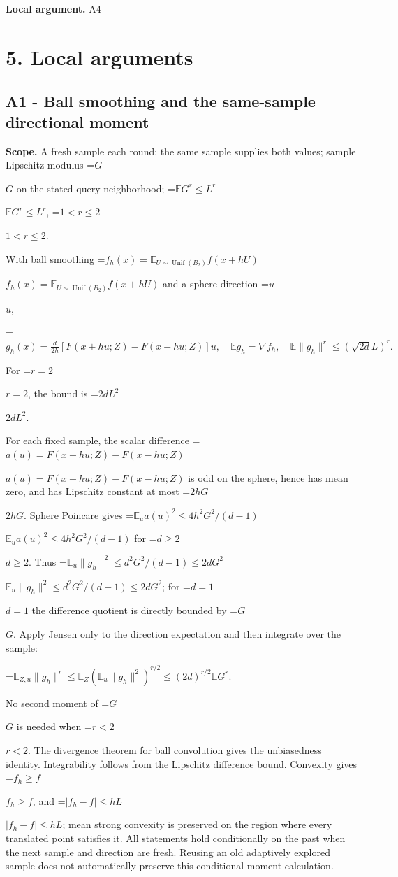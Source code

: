 \documentclass[10pt,a4paper]{article}
\newcommand{\AtlasMath}[1]{\par\begingroup\centering\setbox0=\hbox{$\displaystyle #1$}\ifdim\wd0>1.4\linewidth\typeout{ATLAS WIDE FORMULA: \the\wd0}\fi\ifdim\wd0>\linewidth\resizebox{\linewidth}{!}{\box0}\else\box0\fi\par\endgroup}
\newcommand{\AtlasInlineMath}[1]{\begingroup\setbox0=\hbox{$#1$}\ifdim\wd0>.4\linewidth\endgroup\AtlasMath{#1}\else\endgroup$#1$\fi}
\begin{document}
\textbf{Local argument.} A4

\section{5. Local arguments}
\subsection{A1 - Ball smoothing and the same-sample directional moment}
\textbf{Scope.} A fresh sample each round; the same sample supplies both values; sample Lipschitz modulus \AtlasInlineMath{G} on the stated query neighborhood; \AtlasInlineMath{\mathbb E G^r\le L^r}, \AtlasInlineMath{1<r\le2}.

With ball smoothing \AtlasInlineMath{f_h(x)=\mathbb E_{U\sim\operatorname{Unif}(B_2)}f(x+hU)} and a sphere direction \AtlasInlineMath{u},

\AtlasMath{g_h(x)=\frac d{2h}[F(x+hu;Z)-F(x-hu;Z)]u,\quad\mathbb E g_h=\nabla f_h,\quad\mathbb E\|g_h\|^r\le(\sqrt{2d}L)^r.}

For \AtlasInlineMath{r=2}, the bound is \AtlasInlineMath{2dL^2}.

For each fixed sample, the scalar difference \AtlasInlineMath{a(u)=F(x+hu;Z)-F(x-hu;Z)} is odd on the sphere, hence has mean zero, and has Lipschitz constant at most \AtlasInlineMath{2hG}. Sphere Poincare gives \AtlasInlineMath{\mathbb E_u a(u)^2\le4h^2G^2/(d-1)} for \AtlasInlineMath{d\ge2}. Thus \AtlasInlineMath{\mathbb E_u\|g_h\|^2\le d^2G^2/(d-1)\le2dG^2}; for \AtlasInlineMath{d=1} the difference quotient is directly bounded by \AtlasInlineMath{G}. Apply Jensen only to the direction expectation and then integrate over the sample:

\AtlasMath{\mathbb E_{Z,u}\|g_h\|^r\le\mathbb E_Z(\mathbb E_u\|g_h\|^2)^{r/2}\le(2d)^{r/2}\mathbb E G^r.}

No second moment of \AtlasInlineMath{G} is needed when \AtlasInlineMath{r<2}. The divergence theorem for ball convolution gives the unbiasedness identity. Integrability follows from the Lipschitz difference bound. Convexity gives \AtlasInlineMath{f_h\ge f}, and \AtlasInlineMath{|f_h-f|\le hL}; mean strong convexity is preserved on the region where every translated point satisfies it. All statements hold conditionally on the past when the next sample and direction are fresh. Reusing an old adaptively explored sample does not automatically preserve this conditional moment calculation.
\end{document}
